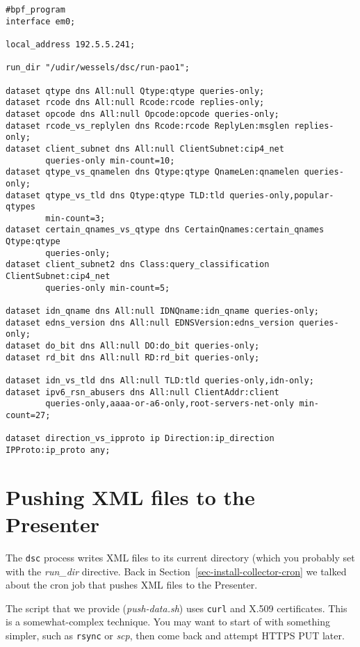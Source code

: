 \documentclass{report}
\begin{document}
\begin{footnotesize}
\begin{verbatim}
#bpf_program
interface em0;

local_address 192.5.5.241;

run_dir "/udir/wessels/dsc/run-pao1";

dataset qtype dns All:null Qtype:qtype queries-only;
dataset rcode dns All:null Rcode:rcode replies-only;
dataset opcode dns All:null Opcode:opcode queries-only;
dataset rcode_vs_replylen dns Rcode:rcode ReplyLen:msglen replies-only;
dataset client_subnet dns All:null ClientSubnet:cip4_net
        queries-only min-count=10;
dataset qtype_vs_qnamelen dns Qtype:qtype QnameLen:qnamelen queries-only;
dataset qtype_vs_tld dns Qtype:qtype TLD:tld queries-only,popular-qtypes
        min-count=3;
dataset certain_qnames_vs_qtype dns CertainQnames:certain_qnames Qtype:qtype
        queries-only;
dataset client_subnet2 dns Class:query_classification ClientSubnet:cip4_net
        queries-only min-count=5;

dataset idn_qname dns All:null IDNQname:idn_qname queries-only;
dataset edns_version dns All:null EDNSVersion:edns_version queries-only;
dataset do_bit dns All:null DO:do_bit queries-only;
dataset rd_bit dns All:null RD:rd_bit queries-only;

dataset idn_vs_tld dns All:null TLD:tld queries-only,idn-only;
dataset ipv6_rsn_abusers dns All:null ClientAddr:client
        queries-only,aaaa-or-a6-only,root-servers-net-only min-count=27;

dataset direction_vs_ipproto ip Direction:ip_direction IPProto:ip_proto any;
\end{verbatim}
\end{footnotesize}

\noindent\hrulefill

\section{Pushing XML files to the Presenter}

The {\tt dsc\/} process writes XML files to its current directory
(which you probably set with the {\em run\_dir\/} directive.  Back
in Section~\ref{sec-install-collector-cron} we talked about the
cron job that pushes XML files to the Presenter.

The script that we provide ({\em push-data.sh\/}) uses {\tt curl\/}
and X.509 certificates.  This is a somewhat-complex technique.  You
may want to start of with something simpler, such as {\tt rsync\/}
or {\em scp\/}, then come back and attempt HTTPS PUT later.
\end{document}
